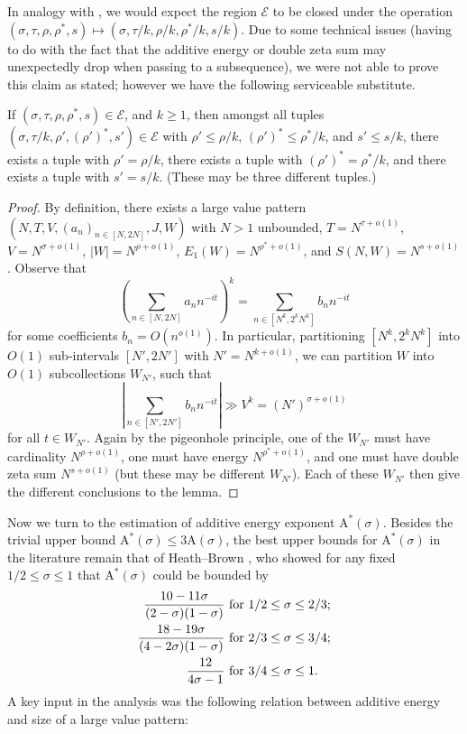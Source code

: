 \documentclass[a4paper, 10pt]{amsart}
\newcommand{\A}{\mathrm{A}}
\newcommand{\Energy}{\mathcal{E}}
\begin{document}
In analogy with , we would expect the region $\Energy$ to be closed under the operation $(\sigma,\tau,\rho,\rho^*,s) \mapsto (\sigma,\tau/k, \rho/k, \rho^*/k, s/k)$.  Due to some technical issues (having to do with the fact that the additive energy or double zeta sum may unexpectedly drop when passing to a subsequence), we were not able to prove this claim as stated; however we have the following serviceable substitute.

\begin{lemma}\label{power-energy}  If $(\sigma,\tau,\rho,\rho^*,s) \in \Energy$, and $k \geq 1$, then amongst all tuples $(\sigma,\tau/k,\rho',(\rho')^*,s') \in \Energy$ with $\rho' \leq \rho/k$, $(\rho')^* \leq \rho^*/k$, and $s' \leq s/k$, there exists a tuple with $\rho' = \rho/k$, there exists a tuple with $(\rho')^* = \rho^*/k$, and there exists a tuple with $s' = s/k$. (These may be three different tuples.)
\end{lemma}

\begin{proof} By definition, there exists a large value pattern $(N,T,V,(a_n)_{n \in [N,2N]},J,W)$ with $N > 1$ unbounded, $T = N^{\tau+o(1)}$, $V = N^{\sigma+o(1)}$, $|W| = N^{\rho+o(1)}$, $E_1(W) = N^{\rho^*+o(1)}$, and $S(N,W) = N^{s+o(1)}$.  Observe that
    $$ \left( \sum_{n \in [N,2N]} a_n n^{-it} \right)^k = \sum_{n \in [N^k, 2^k N^k]} b_n n^{-it}$$
for some coefficients $b_n = O(n^{o(1)})$.  In particular, partitioning $[N^k, 2^k N^k]$ into $O(1)$ sub-intervals $[N',2N']$ with $N' = N^{k+o(1)}$, we can partition $W$ into $O(1)$ subcollections $W_{N'}$, such that
$$ \left| \sum_{n \in [N',2N']} b_n n^{-it} \right| \gg V^k = (N')^{\sigma+o(1)}$$
for all $t \in W_{N'}$.  Again by the pigeonhole principle, one of the $W_{N'}$ must have cardinality $N^{\rho+o(1)}$, one must have energy $N^{\rho^*+o(1)}$, and one must have double zeta sum $N^{s+o(1)}$ (but these may be different $W_{N'}$).  Each of these $W_{N'}$ then give the different conclusions to the lemma.
\end{proof}

Now we turn to the estimation of additive energy exponent $\A^*(\sigma)$.  Besides the trivial upper bound $\A^*(\sigma) \leq 3 \A(\sigma)$, the best upper bounds for $\A^*(\sigma)$ in the literature remain that of Heath--Brown \cite{heathbrown_zero_1979}, who showed for any fixed $1/2 \leq \sigma \leq 1$ that $\A^*(\sigma)$ could be bounded by
\begin{align*}
        \frac{10-11\sigma}{(2-\sigma)(1-\sigma)} & \hbox{ for } 1/2 \leq \sigma \leq 2/3;\\
        \frac{18-19\sigma}{(4-2\sigma)(1-\sigma)} & \hbox{ for } 2/3 \leq \sigma \leq 3/4;\\
        \frac{12}{4\sigma-1} & \hbox{ for } 3/4 \leq \sigma \leq 1.
\end{align*}
A key input in the analysis was the following relation between additive energy and size of a large value pattern:
\end{document}
